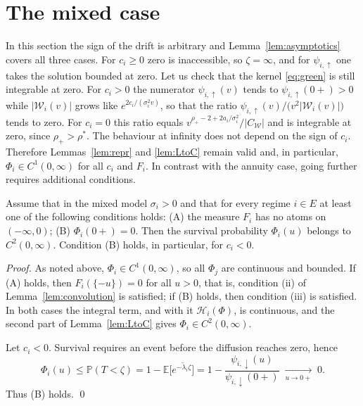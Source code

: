 \documentclass[smallextended]{svjour3}
\newcommand{\bbp}{\mathbb{P}}
\newcommand{\bbe}{\mathbb{E}}
\begin{document}
\section{The mixed case}
\label{s6}

In this section the sign of the drift is arbitrary and
Lemma~\ref{lem:asymptotics} covers all three cases. For $c_i\ge0$ zero is
inaccessible, so $\zeta=\infty$, and for $\psi_{i,\uparrow}$ one takes the
solution bounded at zero. Let us check that the kernel \eqref{eq:green} is
still integrable at zero. For $c_i>0$ the numerator $\psi_{i,\uparrow}(v)$
tends to $\psi_{i,\uparrow}(0+)>0$ while $|\mathcal W_i(v)|$ grows like
$e^{2c_i/(\sigma_i^2v)}$, so that the ratio
$\psi_{i,\uparrow}(v)/\bigl(v^2|\mathcal W_i(v)|\bigr)$ tends to zero. For
$c_i=0$ this ratio equals $v^{\rho_+-2+2a_i/\sigma_i^2}/|C_{\mathcal W}|$ and
is integrable at zero, since $\rho_+>\rho^*$. The behaviour at infinity does
not depend on the sign of $c_i$. Therefore Lemmas~\ref{lem:repr} and
\ref{lem:LtoC} remain valid and, in particular, $\Phi_i\in C^1(0,\infty)$ for
all $c_i$ and $F_i$. In contrast with the annuity case, going further requires
additional conditions.

\begin{theorem}
\label{thm:mixed_case}
Assume that in the mixed model $\sigma_i>0$ and that for every regime $i\in E$
at least one of the following conditions holds:
{\rm(A)} the measure $F_i$ has no atoms on $(-\infty,0)$;
{\rm(B)} $\Phi_i(0+)=0$.
Then the survival probability $\Phi_i(u)$ belongs to $C^2(0,\infty)$.
Condition {\rm(B)} holds, in particular, for $c_i<0$.
\end{theorem}

\begin{proof}
As noted above, $\Phi_i\in C^1(0,\infty)$, so all $\Phi_j$ are continuous and
bounded. If {\rm(A)} holds, then $F_i(\{-u\})=0$ for all $u>0$, that is,
condition {\rm(ii)} of Lemma~\ref{lem:convolution} is satisfied; if {\rm(B)}
holds, then condition {\rm(iii)} is satisfied. In both cases the integral term,
and with it $\mathcal H_i(\Phi)$, is continuous, and the second part of
Lemma~\ref{lem:LtoC} gives $\Phi_i\in C^2(0,\infty)$.

Let $c_i<0$. Survival requires an event before the diffusion reaches zero,
hence
$$
\Phi_i(u)\le\bbp(T<\zeta)=1-\bbe\bigl[e^{-\tilde\lambda_i\zeta}\bigr]
=1-\frac{\psi_{i,\downarrow}(u)}{\psi_{i,\downarrow}(0+)}
\;\xrightarrow[u\to0+]{}\;0 .
$$
Thus {\rm(B)} holds.
\qed
\end{proof}
\end{document}
